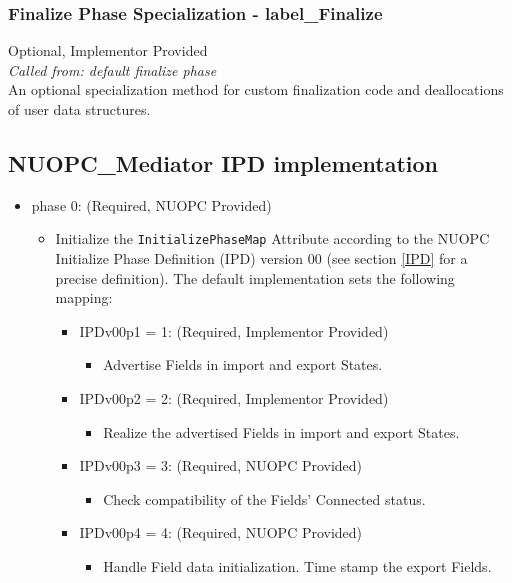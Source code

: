 \subsubsection{Finalize Phase Specialization - label\_Finalize}
{\sc Optional, Implementor Provided}\\
{\em Called from: default finalize phase}\\

An optional specialization method for custom finalization code and deallocations of user data structures.

\subsection{NUOPC\_Mediator IPD implementation}
\begin{itemize}
\item phase 0: ({\sc Required, NUOPC Provided})
  \begin{itemize}
  \item Initialize the {\tt InitializePhaseMap} Attribute according to the NUOPC Initialize Phase Definition (IPD) version 00 (see section \ref{IPD} for a precise definition). The default implementation sets the following mapping:
    \begin{itemize}
    \item IPDv00p1 = 1: ({\sc Required, Implementor Provided})
      \begin{itemize}
      \item Advertise Fields in import and export States.
      \end{itemize}
    \item IPDv00p2 = 2: ({\sc Required, Implementor Provided})
      \begin{itemize}
      \item Realize the advertised Fields in import and export States.
      \end{itemize}  
    \item IPDv00p3 = 3: ({\sc Required, NUOPC Provided})
      \begin{itemize}
      \item Check compatibility of the Fields' Connected status.
      \end{itemize}
    \item IPDv00p4 = 4: ({\sc Required, NUOPC Provided})
      \begin{itemize}
      \item Handle Field data initialization. Time stamp the export Fields.

\end{itemize}
\end{itemize}
\end{itemize}
\end{itemize}
